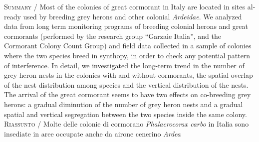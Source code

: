 \begin{otherlanguage}{english}
{\small
\noindent \textsc{\color{MUSEBLUE} Summary} / Most of the colonies of great cormorant in Italy are located in sites
already used by breeding grey herons and other colonial
\textit{Ardeidae}. We analyzed data from long term monitoring programs
of breeding colonial herons and great cormorants (performed by the
research group {\textquotedblleft}Garzaie Italia{\textquotedblright},
and the Cormorant Colony Count Group) and field data collected in a
sample of colonies where the two species breed in synthopy, in order to
check any potential pattern of interference. In detail, we investigated
the long-term trend in the number of grey heron nests in the colonies
with and without cormorants, the spatial overlap of the nest
distribution among species and the vertical distribution of the nests.
The arrival of the great cormorant seems to have two effects on
co-breeding grey herons: a gradual diminution of the number of grey
heron nests and a gradual spatial and vertical segregation between the
two species inside the same colony.  \\
\noindent \textsc{\color{MUSEBLUE} Riassunto} / Molte delle colonie di cormorano \textit{Phalacrocorax carbo} in Italia
sono insediate in aree occupate anche da airone cenerino \textit{Ardea
}}
\end{otherlanguage}
